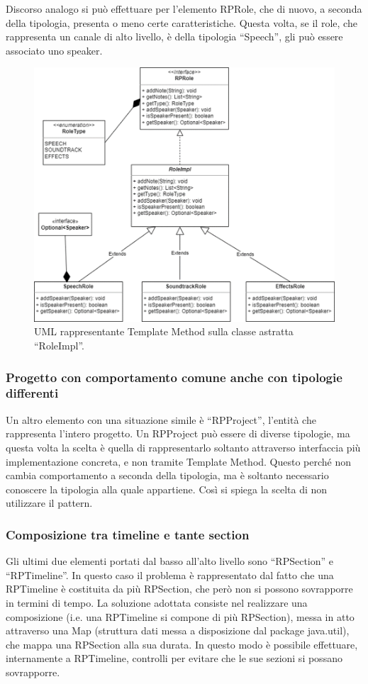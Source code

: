 \documentclass[a4paper,12pt]{report}
\begin{document}
Discorso analogo si può effettuare per l’elemento RPRole, che di nuovo, a seconda della tipologia, presenta o meno certe caratteristiche. Questa volta, se il role, che rappresenta un canale di alto livello, è della tipologia “Speech”, gli può essere associato uno speaker.
\endsubsubsection

\begin{figure}[h]
\centering{}
\includegraphics[width=\textwidth,scale=1]{img/role.png}
\caption{UML rappresentante Template Method sulla classe astratta “RoleImpl”.}
\end{figure}

\subsubsection{Progetto con comportamento comune anche con tipologie differenti}
Un altro elemento con una situazione simile è “RPProject”, l’entità che rappresenta l’intero progetto. Un RPProject può essere di diverse tipologie, ma questa volta la scelta è quella di rappresentarlo soltanto attraverso interfaccia più implementazione concreta, e non tramite Template Method. Questo perché non cambia comportamento a seconda della tipologia, ma è soltanto necessario conoscere la tipologia alla quale appartiene. Così si spiega la scelta di non utilizzare il pattern.
\endsubsubsection

\subsubsection{Composizione tra timeline e tante section}
Gli ultimi due elementi portati dal basso all’alto livello sono “RPSection” e “RPTimeline”. In questo caso il problema è rappresentato dal fatto che una RPTimeline è costituita da più RPSection, che però non si possono sovrapporre in termini di tempo. La soluzione adottata consiste nel realizzare una composizione (i.e. una RPTimeline si compone di più RPSection), messa in atto attraverso una Map (struttura dati messa a disposizione dal package java.util), che mappa una RPSection alla sua durata. In questo modo è possibile effettuare, internamente a RPTimeline, controlli per evitare che le sue sezioni si possano sovrapporre.
\endsubsubsection
\end{document}

